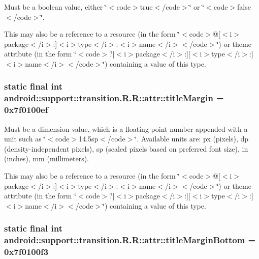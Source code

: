 Must be a boolean value, either \char`\"{}$<$code$>$true$<$/code$>$\char`\"{} or \char`\"{}$<$code$>$false$<$/code$>$\char`\"{}. 

This may also be a reference to a resource (in the form \char`\"{}$<$code$>$@\mbox{[}$<$i$>$package$<$/i$>$:\mbox{]}$<$i$>$type$<$/i$>$:$<$i$>$name$<$/i$>$$<$/code$>$\char`\"{}) or theme attribute (in the form \char`\"{}$<$code$>$?\mbox{[}$<$i$>$package$<$/i$>$:\mbox{]}\mbox{[}$<$i$>$type$<$/i$>$:\mbox{]}$<$i$>$name$<$/i$>$$<$/code$>$\char`\"{}) containing a value of this type. \hypertarget{classandroid_1_1support_1_1transition_1_1_r_1_1attr_61cc59eeca6ceac10e469a22d48de170}{
\subsubsection[{titleMargin}]{\setlength{\rightskip}{0pt plus 5cm}static final int android::support::transition.R.R::attr::titleMargin = 0x7f0100ef}}
\label{classandroid_1_1support_1_1transition_1_1_r_1_1attr_61cc59eeca6ceac10e469a22d48de170}


Must be a dimension value, which is a floating point number appended with a unit such as \char`\"{}$<$code$>$14.5sp$<$/code$>$\char`\"{}. Available units are: px (pixels), dp (density-independent pixels), sp (scaled pixels based on preferred font size), in (inches), mm (millimeters). 

This may also be a reference to a resource (in the form \char`\"{}$<$code$>$@\mbox{[}$<$i$>$package$<$/i$>$:\mbox{]}$<$i$>$type$<$/i$>$:$<$i$>$name$<$/i$>$$<$/code$>$\char`\"{}) or theme attribute (in the form \char`\"{}$<$code$>$?\mbox{[}$<$i$>$package$<$/i$>$:\mbox{]}\mbox{[}$<$i$>$type$<$/i$>$:\mbox{]}$<$i$>$name$<$/i$>$$<$/code$>$\char`\"{}) containing a value of this type. \hypertarget{classandroid_1_1support_1_1transition_1_1_r_1_1attr_86bc405218944b677631af0ca84a65b2}{
\subsubsection[{titleMarginBottom}]{\setlength{\rightskip}{0pt plus 5cm}static final int android::support::transition.R.R::attr::titleMarginBottom = 0x7f0100f3}}
\label{classandroid_1_1support_1_1transition_1_1_r_1_1attr_86bc405218944b677631af0ca84a65b2}


